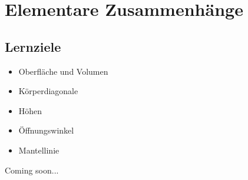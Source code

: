\section{Elementare Zusammenhänge}
\sectuntertitel{}


\subsection*{Lernziele}
\begin{itemize}
\item Oberfläche und Volumen
\item Körperdiagonale
\item Höhen
\item Öffnungswinkel
\item Mantellinie
\end{itemize}

Coming soon...
